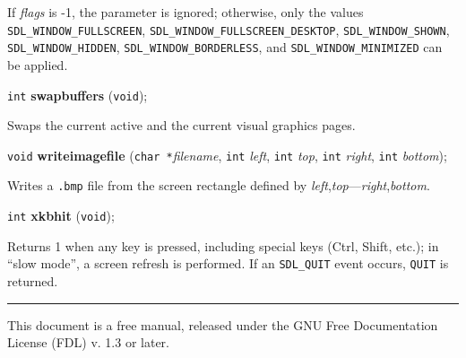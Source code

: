 \documentclass[a4paper,11pt]{article}
\newcommand{\V}{\texttt{void}}      %
\newcommand{\I}{\texttt{int}}       %
\newcommand{\C}{\texttt{char *}}    %
\newcommand{\func}[1]{\textbf{#1}}  %
\newcommand{\A}[1]{\emph{#1}}       %
\newcommand{\F}[1]{\texttt{#1}}     %
\newcommand{\T}[1]{\texttt{#1}}     %
\newenvironment{bgi}
{ %
  \begin{snugshade}
}
{ %
  \end{snugshade}
}
\begin{document}
If \A{flags} is -1, the parameter is ignored; otherwise, only the
values \T{SDL\_WINDOW\_FULLSCREEN},
\T{SDL\_WINDOW\_FULLSCREEN\_DESKTOP}, \T{SDL\_WINDOW\_SHOWN},
\T{SDL\_WINDOW\_HIDDEN}, \T{SDL\_WINDOW\-\_BORDERLESS}, and
\T{SDL\_WINDOW\_MINIMIZED} can be applied.


\begin{bgi}
\I{} \func{swapbuffers} (\V{});
\end{bgi}

Swaps the current active and the current visual graphics pages.


\begin{bgi}
\V{} \func{writeimagefile} (\C{}\A{filename}, \I{} \A{left}, \I{}
\A{top}, \I{} \A{right}, \I{} \A{bottom});
\end{bgi}

Writes a \F{.bmp} file from the screen rectangle defined by
\A{left},\A{top}---\A{right},\A{bottom}.


\begin{bgi}
\I{} \func{xkbhit} (\V{});
\end{bgi}

Returns 1 when any key is pressed, including special keys (Ctrl, Shift,
etc.); in ``slow mode'', a screen refresh is performed. If an
\T{SDL\_QUIT} event occurs, \T{QUIT} is returned.


\bigskip

\rule{\linewidth}{0.2pt}

This document is a free manual, released under the GNU Free
Documentation License (FDL) v. 1.3 or later.
\end{document}

